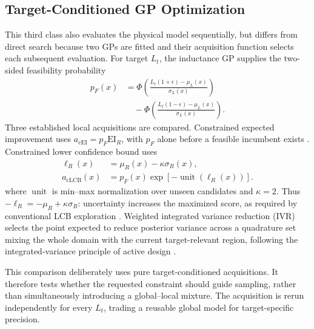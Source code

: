 \documentclass[conference]{IEEEtran}
\begin{document}
\subsection{Target-Conditioned GP Optimization}
This third class also evaluates the physical model sequentially, but differs from direct search because two GPs are fitted and their acquisition function selects each subsequent evaluation. For target $L_t$, the inductance GP supplies the two-sided feasibility probability
\begin{equation}
\begin{aligned}
p_F(x)&=\Phi\!\left(\frac{L_t(1+\epsilon)-\mu_L(x)}{\sigma_L(x)}\right)\\
&\quad-\Phi\!\left(\frac{L_t(1-\epsilon)-\mu_L(x)}{\sigma_L(x)}\right).
\end{aligned}
\end{equation}
Three established local acquisitions are compared. Constrained expected improvement uses $a_{\mathrm{cEI}}=p_F\mathrm{EI}_R$, with $p_F$ alone before a feasible incumbent exists \cite{gardner}. Constrained lower confidence bound uses
\begin{equation}
\begin{aligned}
\ell_R(x)&=\mu_R(x)-\kappa\sigma_R(x),\\
a_{\mathrm{cLCB}}(x)&=p_F(x)\exp[-\operatorname{unit}(\ell_R(x))].
\end{aligned}
\end{equation}
where $\operatorname{unit}$ is min--max normalization over unseen candidates and $\kappa=2$. Thus $-\ell_R=-\mu_R+\kappa\sigma_R$: uncertainty increases the maximized score, as required by conventional LCB exploration \cite{srinivas}. Weighted integrated variance reduction (IVR) selects the point expected to reduce posterior variance across a quadrature set mixing the whole domain with the current target-relevant region, following the integrated-variance principle of active design \cite{cohn}.

This comparison deliberately uses pure target-conditioned acquisitions. It therefore tests whether the requested constraint should guide sampling, rather than simultaneously introducing a global--local mixture. The acquisition is rerun independently for every $L_t$, trading a reusable global model for target-specific precision.
\end{document}

